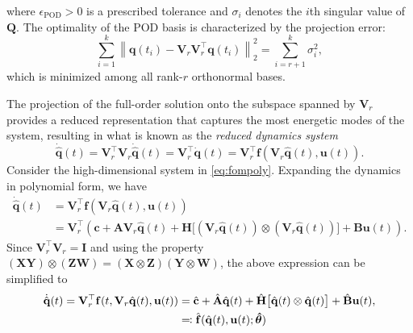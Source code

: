 where $\epsilon_{\text{POD}} > 0$ is a prescribed tolerance and $\sigma_i$ denotes the $i$th singular value of $\mathbf{Q}$. The optimality of the POD basis is characterized by the projection error:\\
\begin{equation}
    \sum_{i=1}^k\left\|\mathbf{q}(t_i) - \mathbf{V}_r^{}\mathbf{V}_r^\top\mathbf{q}(t_i)\right\|_2^2 = \sum_{i=r+1}^k \sigma_i^2,
    \label{eq:pod_error}
\end{equation}
which is minimized among all rank-$r$ orthonormal bases.

The projection of the full-order solution onto the subspace spanned by $\mathbf{V}_r$ provides a reduced representation that captures the most energetic modes of the system, resulting in what is known as the \textit{reduced dynamics system}\\
\begin{equation}
    \dot{\hat{\mathbf{q}}}(t) = \mathbf{V}_r^{\top}\mathbf{V}_r^{}\dot{\hat{\mathbf{q}}}(t) = \mathbf{V}_r^{\top}\dot{\mathbf{q}}(t)  = \mathbf{V}_r^{\top}\mathbf{f}( \mathbf{V}_r\hat{\mathbf{q}}(t), \mathbf{u}(t)).
    \label{eq:reduced_system}
\end{equation}
Consider the high-dimensional system in \eqref{eq:fompoly}. Expanding the dynamics in polynomial form, we have\\
\begin{align*}
    \dot{\hat{\mathbf{q}}}(t) &= \mathbf{V}_r^{\top}\mathbf{f}(\mathbf{V}_r\hat{\mathbf{q}}(t), \mathbf{u}(t))\\
    &= \mathbf{V}_r^{\top}\left( \mathbf{c} + \mathbf{A}\mathbf{V}_r\hat{\mathbf{q}}(t) + \mathbf{H}\bigl[(\mathbf{V}_r\hat{\mathbf{q}}(t)) \otimes (\mathbf{V}_r\hat{\mathbf{q}}(t))\bigr] + \mathbf{B}\mathbf{u}(t) \right).
\end{align*}
Since $\mathbf{V}_r^{\top}\mathbf{V}_r^{} = \mathbf{I}$ and using the property $(\mathbf{XY})\otimes(\mathbf{ZW})=(\mathbf{X}\otimes\mathbf{Z})(\mathbf{Y}\otimes\mathbf{W})$, the above expression can be simplified to\\
\begin{align}
    \dot{\hat{\mathbf{q}}}(t) = \mathbf{V}_r^{\top}\mathbf{f}(t, \mathbf{V}_r\hat{\mathbf{q}}(t), \mathbf{u}(t)) &= \hat{\mathbf{c}} + \hat{\mathbf{A}}\hat{\mathbf{q}}(t) + \hat{\mathbf{H}}\bigl[ \hat{\mathbf{q}}(t)\otimes\hat{\mathbf{q}}(t)\bigr] + \hat{\mathbf{B}}\mathbf{u}(t),\notag \\
    &\eqqcolon \hat{\mathbf{f}}(\hat{\mathbf{q}}(t),\mathbf{u}(t);\bm{\hat{\theta}})
    \label{eq:redopinf}
\end{align}
